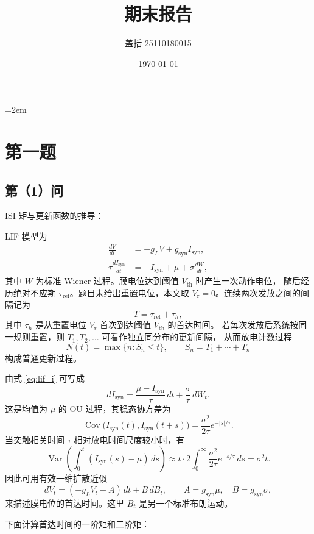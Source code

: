 \documentclass[UTF8]{ctexart}
\title{期末报告}
\author{盖括 25110180015}
\date{\today}
\begin{document}
	\emergencystretch=2em
	\maketitle

\section{第一题}


\subsection{第（1）问}

ISI 矩与更新函数的推导：

LIF 模型为
\begin{align}
	\frac{dV}{dt} &= -g_L V + g_{\mathrm{syn}} I_{\mathrm{syn}}, \label{eq:lif_v}\\
	\tau \frac{d I_{\mathrm{syn}}}{dt}
	&= - I_{\mathrm{syn}}+\mu+\sigma \frac{dW}{dt}, \label{eq:lif_i}
\end{align}
其中 $W$ 为标准 Wiener 过程。膜电位达到阈值 $V_{\mathrm{th}}$ 时产生一次动作电位，
随后经历绝对不应期 $\tau_{\mathrm{ref}}$。题目未给出重置电位，本文取
$V_{\mathrm{r}}=0$。连续两次发放之间的间隔记为
\[
T=\tau_{\mathrm{ref}}+\tau_h,
\]
其中 $\tau_h$ 是从重置电位 $V_{\mathrm r}$ 首次到达阈值 $V_{\mathrm{th}}$ 的首达时间。
若每次发放后系统按同一规则重置，则 $T_1,T_2,\ldots$ 可看作独立同分布的更新间隔，
从而放电计数过程
\[
N(t)=\max\{n:S_n\le t\},\qquad S_n=T_1+\cdots+T_n
\]
构成普通更新过程。




由式 \eqref{eq:lif_i} 可写成
\[
dI_{\mathrm{syn}}
=\frac{\mu-I_{\mathrm{syn}}}{\tau}\,dt+\frac{\sigma}{\tau}\,dW_t.
\]
这是均值为 $\mu$ 的 OU 过程，其稳态协方差为
\[
\operatorname{Cov}\bigl(I_{\mathrm{syn}}(t),I_{\mathrm{syn}}(t+s)\bigr)
=\frac{\sigma^2}{2\tau}e^{-|s|/\tau}.
\]
当突触相关时间 $\tau$ 相对放电时间尺度较小时，有
\[
\operatorname{Var}\left(\int_0^t (I_{\mathrm{syn}}(s)-\mu)\,ds\right)
\approx t\cdot 2\int_0^\infty \frac{\sigma^2}{2\tau}e^{-s/\tau}\,ds
=\sigma^2 t.
\]
因此可用有效一维扩散近似
\begin{equation}
	dV_t=(-g_LV_t+A)\,dt+B\,dB_t,\qquad
	A=g_{\mathrm{syn}}\mu,\quad B=g_{\mathrm{syn}}\sigma,
	\label{eq:effective_diffusion}
\end{equation}
来描述膜电位的首达时间。这里 $B_t$ 是另一个标准布朗运动。

下面计算首达时间的一阶矩和二阶矩：
\end{document}

